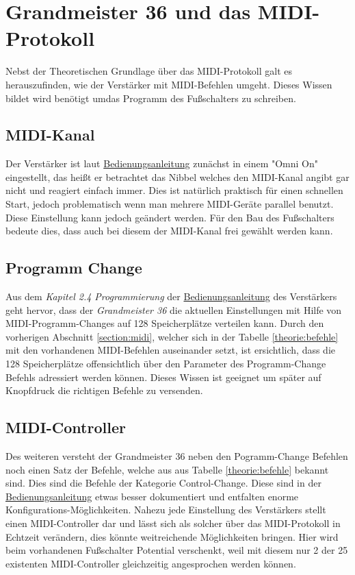 \section{Grandmeister 36 und das MIDI-Protokoll}

Nebst der Theoretischen Grundlage über das MIDI-Protokoll galt es herauszufinden, wie der Verstärker mit MIDI-Befehlen umgeht. Dieses Wissen bildet wird benötigt umdas Programm des Fußschalters zu schreiben.  

\subsection{MIDI-Kanal}
Der Verstärker ist laut \href{http://hughes-and-kettner.com/wp-content/uploads/2014/03/BDA_GrandMeister_1_4_7spr.pdf}{Bedienungsanleitung} zunächst in einem "Omni On" eingestellt, das heißt er betrachtet das Nibbel welches den MIDI-Kanal angibt gar nicht und reagiert einfach immer. Dies ist natürlich praktisch für einen schnellen Start, jedoch problematisch wenn man mehrere MIDI-Geräte parallel benutzt. Diese Einstellung kann jedoch geändert werden. Für den Bau des Fußschalters bedeute dies, dass auch bei diesem der MIDI-Kanal frei gewählt werden kann.

\subsection{Programm Change}
Aus dem \emph{ Kapitel 2.4 Programmierung} der  \href{http://hughes-and-kettner.com/wp-content/uploads/2014/03/BDA_GrandMeister_1_4_7spr.pdf}{Bedienungsanleitung} des Verstärkers geht hervor, dass der \emph{Grandmeister 36} die aktuellen Einstellungen mit Hilfe von MIDI-Programm-Changes auf 128 Speicherplätze verteilen kann. Durch den vorherigen Abschnitt \ref{section:midi}, welcher sich in der Tabelle \ref{theorie:befehle} mit den vorhandenen MIDI-Befehlen auseinander setzt, ist ersichtlich, dass die 128  Speicherplätze offensichtlich über den Parameter des Programm-Change Befehls adressiert werden können. Dieses Wissen ist geeignet um später auf Knopfdruck die richtigen Befehle zu versenden.  
\subsection{MIDI-Controller}

Des weiteren versteht der Grandmeister 36 neben den Pogramm-Change Befehlen noch einen Satz der Befehle, welche aus aus Tabelle \ref{theorie:befehle} bekannt sind. Dies sind die Befehle der Kategorie Control-Change. Diese sind in der  \href{http://hughes-and-kettner.com/wp-content/uploads/2014/03/BDA_GrandMeister_1_4_7spr.pdf}{Bedienungsanleitung} etwas besser dokumentiert und entfalten enorme Konfigurations-Möglichkeiten. Nahezu jede Einstellung des Verstärkers stellt einen MIDI-Controller dar und lässt sich als solcher über das MIDI-Protokoll in Echtzeit verändern, dies könnte weitreichende Möglichkeiten bringen. Hier wird beim vorhandenen Fußschalter Potential verschenkt, weil mit diesem nur 2 der 25 existenten MIDI-Controller gleichzeitig angesprochen werden können.     



